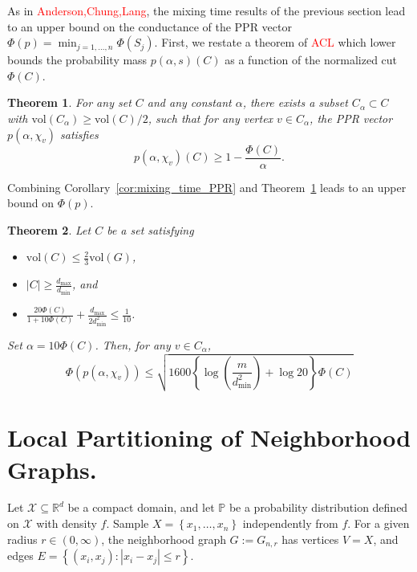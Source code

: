 \documentclass{article}
\newcommand{\Reals}{\mathbb{R}}
\newcommand{\abs}[1]{\left \lvert #1 \right \rvert}
\newcommand{\vol}{\mathrm{vol}}
\newcommand{\set}[1]{\left\{#1\right\}}
\newcommand{\1}{\mathbf{1}}
\theoremstyle{alden}
\theoremstyle{aldenthm}
\newtheorem{theorem}{Theorem}
\theoremstyle{remark}
\begin{document}
As in \textcolor{red}{Anderson,Chung,Lang}, the mixing time results of the previous section lead to an upper bound on the conductance of the PPR vector $\Phi(p) = \min_{j = 1,\ldots,n} \Phi(S_j)$. First, we restate a theorem of \textcolor{red}{ACL} which lower bounds the probability mass $p(\alpha,s)(C)$ as a function of the normalized cut $\Phi(C)$.
\begin{theorem}
	\label{thm:acl_3}
	For any set $C$ and any constant $\alpha$, there exists a subset $C_{\alpha} \subset C$ with $\vol(C_{\alpha}) \geq \vol(C)/2$, such that for any vertex $v \in C_{\alpha}$, the PPR vector $p(\alpha,\chi_v)$ satisfies
	\begin{equation*}
	p(\alpha,\chi_v)(C) \geq 1 - \frac{\Phi(C)}{\alpha}.
	\end{equation*}
\end{theorem}

Combining Corollary~\ref{cor:mixing_time_PPR} and Theorem~\ref{thm:acl_3} leads to an upper bound on $\Phi(p)$.
\begin{theorem}
	\label{thm:conductance_ppr}
	Let $C$ be a set satisfying
	\begin{itemize}
		\item $\vol(C) \leq \frac{2}{3}\vol(G)$,
		\item $\abs{C} \geq \frac{d_{\max}}{d_{\min}}$, and
		\item $\frac{20\Phi(C)}{1 + 10\Phi(C)} + \frac{d_{\max}}{2d_{\min}^2} \leq \frac{1}{10}$.
	\end{itemize}
Set $\alpha = 10\Phi(C)$. Then, for any $v \in C_{\alpha}$,
\begin{equation*}
\Phi(p(\alpha,\chi_v)) \leq \sqrt{1600\left\{\log\left(\frac{m}{d_{\min}^2}\right) + \log 20\right\} \Phi(C)}
\end{equation*}
\end{theorem}

\section{Local Partitioning of Neighborhood Graphs.}

Let $\mathcal{X} \subseteq \Reals^d$ be a compact domain, and let $\mathbb{P}$ be a probability distribution defined on $\mathcal{X}$ with density $f$. Sample $X = \set{x_1,\ldots,x_n}$ independently from $f$. For a given radius $r \in (0,\infty)$, the neighborhood graph $G := G_{n,r}$ has vertices $V = X$, and edges $E = \set{(x_i,x_j): \abs{x_i - x_j} \leq r}$. 
\end{document}
